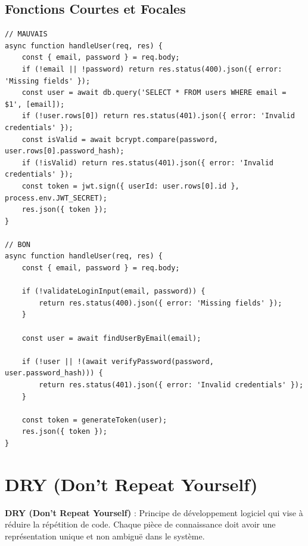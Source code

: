 \subsection{Fonctions Courtes et Focales}

\begin{lstlisting}[style=javascript, caption=Fonction focale]
// MAUVAIS
async function handleUser(req, res) {
    const { email, password } = req.body;
    if (!email || !password) return res.status(400).json({ error: 'Missing fields' });
    const user = await db.query('SELECT * FROM users WHERE email = $1', [email]);
    if (!user.rows[0]) return res.status(401).json({ error: 'Invalid credentials' });
    const isValid = await bcrypt.compare(password, user.rows[0].password_hash);
    if (!isValid) return res.status(401).json({ error: 'Invalid credentials' });
    const token = jwt.sign({ userId: user.rows[0].id }, process.env.JWT_SECRET);
    res.json({ token });
}

// BON
async function handleUser(req, res) {
    const { email, password } = req.body;
    
    if (!validateLoginInput(email, password)) {
        return res.status(400).json({ error: 'Missing fields' });
    }
    
    const user = await findUserByEmail(email);
    
    if (!user || !(await verifyPassword(password, user.password_hash))) {
        return res.status(401).json({ error: 'Invalid credentials' });
    }
    
    const token = generateToken(user);
    res.json({ token });
}
\end{lstlisting}

\section{DRY (Don't Repeat Yourself)}

\begin{definitionbox}
    \textbf{DRY (Don't Repeat Yourself)} : Principe de développement logiciel qui vise à réduire la répétition de code. Chaque pièce de connaissance doit avoir une représentation unique et non ambiguë dans le système.
\end{definitionbox}

